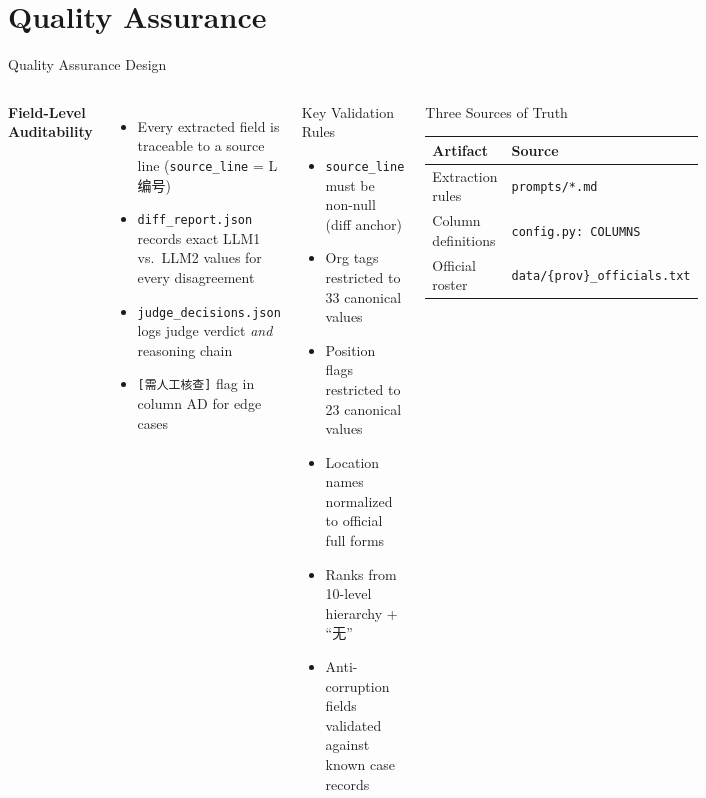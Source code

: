 \documentclass[aspectratio=169, 10pt]{beamer}
\begin{document}
\section{Quality Assurance}

\begin{frame}{Quality Assurance Design}
  \begin{columns}[T]
    \textbf{Field-Level Auditability}
    \begin{itemize}
      \item Every extracted field is traceable to a source line (\texttt{source\_line} = L编号)
      \item \texttt{diff\_report.json} records exact LLM1 vs.\ LLM2 values for every disagreement
      \item \texttt{judge\_decisions.json} logs judge verdict \emph{and} reasoning chain
      \item \texttt{[需人工核查]} flag in column AD for edge cases
    \end{itemize}

 

    \begin{block}{Key Validation Rules}
      \begin{itemize}\scriptsize
        \item \texttt{source\_line} must be non-null (diff anchor)
        \item Org tags restricted to 33 canonical values
        \item Position flags restricted to 23 canonical values
        \item Location names normalized to official full forms
        \item Ranks from 10-level hierarchy + ``无''
        \item Anti-corruption fields validated against known case records
      \end{itemize}
    \end{block}

    \bigskip
    \begin{block}{Three Sources of Truth}
      \scriptsize
      \begin{tabular}{ll}
        \toprule
        Artifact & Source \\
        \midrule
        Extraction rules & \texttt{prompts/*.md} \\
        Column definitions & \texttt{config.py: COLUMNS} \\
        Official roster & \texttt{data/\{prov\}\_officials.txt} \\
        \bottomrule
      \end{tabular}
    \end{block}
  \end{columns}
\end{frame}
\end{document}
